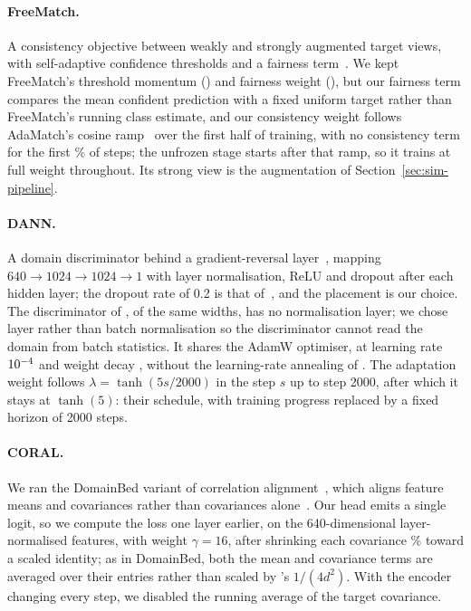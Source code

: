 \paragraph{FreeMatch.} A consistency objective between weakly and strongly augmented target
views, with self-adaptive confidence thresholds and a fairness term~\citep{wang2022freematch}.
We kept FreeMatch's threshold momentum (\fmSatMomentum{}) and fairness weight
(\fmSafWeight{}), but our fairness term compares the mean confident prediction with a fixed
uniform target rather than FreeMatch's running class estimate, and our consistency weight
follows AdaMatch's cosine ramp~\citep{berthelot2022adamatch} over the first half of training,
with no consistency term for the first \fmWarmupPct{}\% of steps; the unfrozen stage starts
after that ramp, so it trains at full weight throughout. Its strong view is the augmentation of
Section~\ref{sec:sim-pipeline}.

\paragraph{DANN.} A domain discriminator behind a gradient-reversal
layer~\citep{ganin2016dann}, mapping $640 \rightarrow 1024 \rightarrow 1024 \rightarrow 1$ with
layer normalisation, ReLU and dropout after each hidden layer; the dropout rate of 0.2 is that
of~\citet{belfiore2024}, and the placement is our choice. The discriminator of \citet{ganin2016dann},
of the same widths, has no normalisation layer; we chose layer rather than batch normalisation so
the discriminator cannot read the domain from batch statistics. It shares the AdamW optimiser,
at learning rate $10^{-4}{}$ and weight decay \dannDiscWd{}, without the learning-rate
annealing of \citet{ganin2016dann}. The adaptation weight follows $\lambda = \tanh(5s/2000)$ in the
step $s$ up to step 2000, after which it stays at $\tanh(5)$: their schedule, with training
progress replaced by a fixed horizon of 2000 steps.

\paragraph{CORAL.} We ran the DomainBed variant of correlation
alignment~\citep{gulrajani2021domainbed}, which aligns feature means and covariances rather
than covariances alone~\citep{sun2016coral}. Our head emits a single logit, so we compute the
loss one layer earlier, on the 640-dimensional layer-normalised features, with weight
$\gamma = 16$, after shrinking each covariance \coralShrinkPct{}\% toward a scaled identity; as
in DomainBed, both the mean and covariance terms are averaged over their entries rather than
scaled by \citeauthor{sun2016coral}'s $1/(4d^2)$. With the encoder changing every step, we disabled the running average of the
target covariance.

